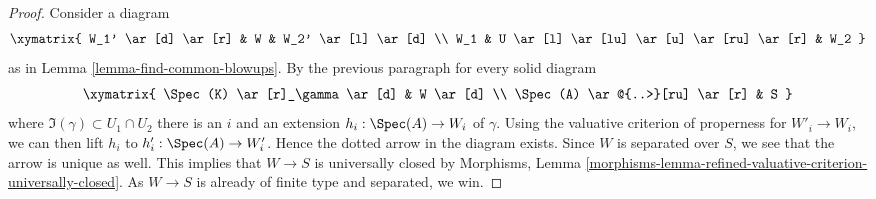 \begin{proof}
\medskip\noindent
Consider a diagram
$$
\xymatrix{
W_1' \ar[d] \ar[r] & W & W_2' \ar[l] \ar[d] \\
W_1 & U \ar[l] \ar[lu] \ar[u] \ar[ru] \ar[r] & W_2
}
$$
as in Lemma \ref{lemma-find-common-blowups}. By the previous paragraph
for every solid diagram
$$
\xymatrix{
\Spec(K) \ar[r]_\gamma  \ar[d] & W \ar[d] \\
\Spec(A) \ar@{..>}[ru] \ar[r] & S
}
$$
where $\Im(\gamma) \subset U_1 \cap U_2$ there is an $i$ and
an extension $h_i : \Spec(A) \to W_i$ of $\gamma$.
Using the valuative criterion of properness for $W'_i \to W_i$,
we can then lift $h_i$ to $h'_i : \Spec(A) \to W'_i$.
Hence the dotted arrow in the diagram exists. Since $W$
is separated over $S$, we see that the arrow is unique as well.
This implies that $W \to S$ is universally closed by
Morphisms, Lemma
\ref{morphisms-lemma-refined-valuative-criterion-universally-closed}.
As $W \to S$ is already of finite type and separated, we win.
\end{proof}
